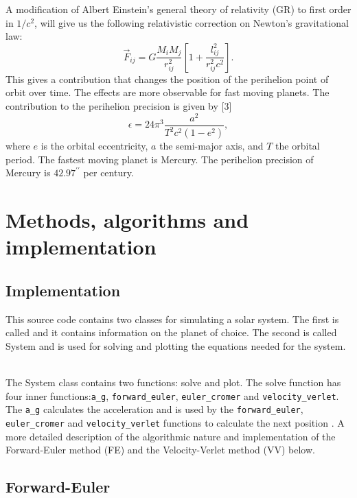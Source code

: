 \documentclass{article}
\begin{document}
A modification of  Albert Einstein's general theory of relativity (GR) to first order in $1/c^2$, will give us the following relativistic correction on Newton's gravitational law:
\begin{equation}
\vec{F}_{ij}= G\frac{M_i M_j}{r_{ij}^2}\left[ 1 + \frac{l_{ij}^2}{r_{ij}^2c^2} \right]. \label{GR_force}
\end{equation}
This gives a contribution that changes the position of the perihelion point of orbit over time. The effects are more observable for fast moving planets. The contribution to the perihelion precision is given by [3]%
\begin{equation}
\epsilon = 24\pi^3 \frac{a^2}{T^2c^2(1-e^2)},
\end{equation}
where $e$ is the orbital eccentricity, $a$ the semi-major axis, and $T$ the orbital period. The fastest moving planet is  Mercury. The perihelion precision of Mercury  is $42.97^{\prime\prime}$ per century.


\section{Methods, algorithms and implementation }

\subsection{Implementation}

This source code contains two classes for simulating a solar system. 
The first is called   and it contains information on the planet of choice. The second is called System and is used for solving and plotting the equations needed for the system.\\\

The System class contains two functions: solve and plot. The solve function has four inner functions:\lstinline{a_g}, \lstinline{forward_euler}, \lstinline{euler_cromer}  and \lstinline{velocity_verlet}.
The \lstinline{a_g} calculates the acceleration and is used by the \lstinline{forward_euler}, \lstinline{euler_cromer}  and \lstinline{velocity_verlet} functions to calculate the next position . A more detailed description of the algorithmic nature and implementation of the Forward-Euler method (FE) and the Velocity-Verlet method (VV) below. 


\subsection{Forward-Euler }\label{const_mot}
\end{document}
